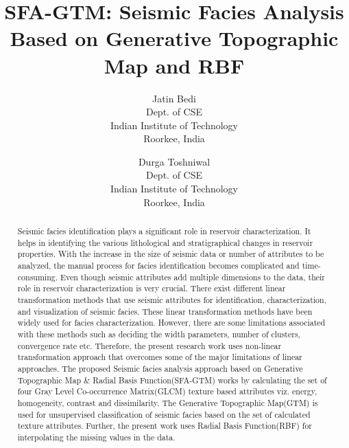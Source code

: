 \documentclass[a4paper]{article}
\title{SFA-GTM: Seismic Facies Analysis Based on Generative Topographic Map and RBF}
\author{
Jatin Bedi \\ Dept. of CSE\\
                Indian Institute of Technology\\Roorkee, India 
\and
Durga Toshniwal \\ Dept. of CSE\\
                Indian Institute of Technology\\Roorkee, India 
}
\begin{document}
\maketitle

\begin{abstract}
Seismic facies identification plays a significant role in reservoir characterization. It helps in identifying the various lithological and stratigraphical changes in reservoir properties. With the increase in the size of seismic data or number of attributes to be analyzed, the manual process for facies identification becomes complicated and time-consuming. Even though seismic attributes add multiple dimensions to the data, their role in reservoir characterization is very crucial. There exist different linear transformation methods that use seismic attributes for identification, characterization, and visualization of seismic facies. These linear transformation methods have been widely used for facies characterization. However, there are some limitations associated with these methods such as deciding the width parameters, number of clusters, convergence rate etc. Therefore, the present research work uses non-linear transformation approach that overcomes some of the major limitations of linear approaches. The proposed Seismic facies analysis approach based on Generative Topographic Map \& Radial Basis Function(SFA-GTM) works by calculating the set of four Gray Level Co-occurrence Matrix(GLCM) texture based attributes viz. energy, homogeneity, contrast and dissimilarity. The Generative Topographic Map(GTM) is used for unsupervised classification of seismic facies based on the set of calculated texture attributes. Further, the present work uses Radial Basis Function(RBF) for interpolating the missing values in the data. 
\end{abstract}
\vskip 32pt
\end{document}
